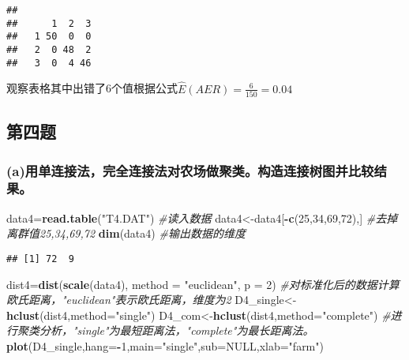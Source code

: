\documentclass[
]{article}
\newenvironment{Shaded}{\begin{snugshade}}{\end{snugshade}}
\newcommand{\CommentTok}[1]{\textcolor[rgb]{0.56,0.35,0.01}{\textit{#1}}}
\newcommand{\DataTypeTok}[1]{\textcolor[rgb]{0.13,0.29,0.53}{#1}}
\newcommand{\DecValTok}[1]{\textcolor[rgb]{0.00,0.00,0.81}{#1}}
\newcommand{\KeywordTok}[1]{\textcolor[rgb]{0.13,0.29,0.53}{\textbf{#1}}}
\newcommand{\NormalTok}[1]{#1}
\newcommand{\OperatorTok}[1]{\textcolor[rgb]{0.81,0.36,0.00}{\textbf{#1}}}
\newcommand{\OtherTok}[1]{\textcolor[rgb]{0.56,0.35,0.01}{#1}}
\newcommand{\StringTok}[1]{\textcolor[rgb]{0.31,0.60,0.02}{#1}}
\begin{document}
\begin{verbatim}
##    
##      1  2  3
##   1 50  0  0
##   2  0 48  2
##   3  0  4 46
\end{verbatim}

观察表格其中出错了6个值根据公式\(\hat{E}(AER)=\frac{6}{150}=0.04\)

\hypertarget{ux7b2cux56dbux9898}{%
\subsection{第四题}\label{ux7b2cux56dbux9898}}

\hypertarget{aux7528ux5355ux8fdeux63a5ux6cd5ux5b8cux5168ux8fdeux63a5ux6cd5ux5bf9ux519cux573aux505aux805aux7c7bux6784ux9020ux8fdeux63a5ux6811ux56feux5e76ux6bd4ux8f83ux7ed3ux679c}{%
\subsubsection{(a)用单连接法，完全连接法对农场做聚类。构造连接树图并比较结果。}\label{aux7528ux5355ux8fdeux63a5ux6cd5ux5b8cux5168ux8fdeux63a5ux6cd5ux5bf9ux519cux573aux505aux805aux7c7bux6784ux9020ux8fdeux63a5ux6811ux56feux5e76ux6bd4ux8f83ux7ed3ux679c}}

\begin{Shaded}
\begin{Highlighting}[]
\NormalTok{data4=}\KeywordTok{read.table}\NormalTok{(}\StringTok{"T4.DAT"}\NormalTok{)   }\CommentTok{#读入数据}
\NormalTok{data4<-data4[}\OperatorTok{-}\KeywordTok{c}\NormalTok{(}\DecValTok{25}\NormalTok{,}\DecValTok{34}\NormalTok{,}\DecValTok{69}\NormalTok{,}\DecValTok{72}\NormalTok{),]   }\CommentTok{#去掉离群值25,34,69,72}
\KeywordTok{dim}\NormalTok{(data4)   }\CommentTok{#输出数据的维度}
\end{Highlighting}
\end{Shaded}

\begin{verbatim}
## [1] 72  9
\end{verbatim}

\begin{Shaded}
\begin{Highlighting}[]
\NormalTok{dist4=}\KeywordTok{dist}\NormalTok{(}\KeywordTok{scale}\NormalTok{(data4), }\DataTypeTok{method =} \StringTok{"euclidean"}\NormalTok{, }\DataTypeTok{p =} \DecValTok{2}\NormalTok{)}
\CommentTok{#对标准化后的数据计算欧氏距离，"euclidean"表示欧氏距离，维度为2}
\NormalTok{D4_single<-}\KeywordTok{hclust}\NormalTok{(dist4,}\DataTypeTok{method=}\StringTok{"single"}\NormalTok{)}
\NormalTok{D4_com<-}\KeywordTok{hclust}\NormalTok{(dist4,}\DataTypeTok{method=}\StringTok{"complete"}\NormalTok{)}
\CommentTok{#进行聚类分析，"single"为最短距离法，"complete"为最长距离法。}
\KeywordTok{plot}\NormalTok{(D4_single,}\DataTypeTok{hang=}\OperatorTok{-}\DecValTok{1}\NormalTok{,}\DataTypeTok{main=}\StringTok{"single"}\NormalTok{,}\DataTypeTok{sub=}\OtherTok{NULL}\NormalTok{,}\DataTypeTok{xlab=}\StringTok{"farm"}\NormalTok{)}
\end{Highlighting}
\end{Shaded}
\end{document}
